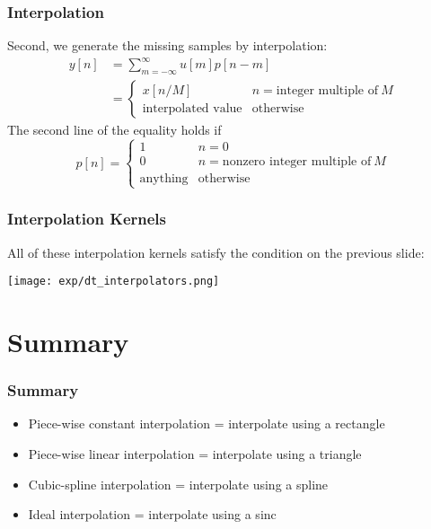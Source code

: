 \documentclass{beamer}
\begin{document}
\begin{frame}
  \frametitle{Interpolation}

  Second, we generate the missing samples by interpolation:
  \begin{align*}
    y[n] &= \sum_{m=-\infty}^\infty u[m] p[n-m]\\
    &=\left\{\begin{array}{ll}
    x[n/M] & n=\text{integer multiple of}~M\\
    \text{interpolated value}&\text{otherwise}
    \end{array}\right.
  \end{align*}
  The second line of the equality holds if
  \begin{displaymath}
    p[n] =\left\{\begin{array}{ll}
    1 & n=0\\
    0 & n=\text{nonzero integer multiple of}~M\\
    \text{anything}&\text{otherwise}
    \end{array}\right.
  \end{displaymath}
\end{frame}
    
\begin{frame}
  \frametitle{Interpolation Kernels}
  All of these interpolation kernels satisfy the condition on the previous slide:
  
  \centerline{\texttt{[image: exp/dt\_interpolators.png]}}  
\end{frame}

\section[Summary]{Summary}
\setcounter{subsection}{1}

\begin{frame}
  \frametitle{Summary}
  \begin{itemize}
  \item Piece-wise constant interpolation = interpolate using a rectangle
  \item Piece-wise linear interpolation = interpolate using a triangle
  \item Cubic-spline interpolation = interpolate using a spline
  \item Ideal interpolation = interpolate using a sinc
  \end{itemize}
\end{frame}
\end{document}
